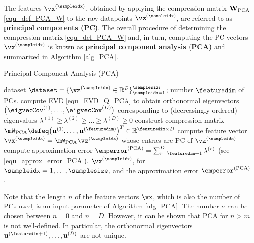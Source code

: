 \documentclass[12pt]{report}
\begin{document}
The features $\vx^{(\sampleidx)}$, obtained by applying the compression matrix $\mathbf{W}_{\rm PCA}$ 
\eqref{equ_def_PCA_W} to the raw datapoints $\vz^{(\sampleidx)}$, are referred to as {\bf principal components (PC)}. 
The overall procedure of determining the compression matrix \eqref{equ_def_PCA_W} and, in turn, computing 
the PC vectors $\vx^{(\sampleidx)}$ is known as {\bf principal component analysis (PCA)} and summarized 
in Algorithm \ref{alg_PCA}. 
\begin{algorithm}[htbp]
\caption{Principal Component Analysis (PCA)}\label{alg_PCA}
\begin{algorithmic}[1]
\renewcommand{\algorithmicrequire}{\textbf{Input:}}
\renewcommand{\algorithmicensure}{\textbf{Output:}}
\Require  dataset  $\dataset=\{ \vz^{(\sampleidx)} \in \mathbb{R}^{D} \}_{\sampleidx=1}^{\samplesize}$; number $\featuredim$ of PCs. 
\State compute EVD \eqref{equ_EVD_Q_PCA} to obtain orthonormal eigenvectors $\big(\eigvecCov^{(1)},\ldots,\eigvecCov^{(D)}\big)$ 
corresponding to (decreasingly ordered) eigenvalues $\lambda^{(1)} \geq \lambda^{(2)}\geq \ldots \geq \lambda^{(D)} \geq 0$
\vspace*{2mm}
\State construct compression matrix $\mW_{\rm PCA}  \defeq \big( \mathbf{u}^{(1)},\ldots, \mathbf{u}^{(\featuredim)} \big)^{T} \in \mathbb{R}^{\featuredim \times D}$ %
\vspace*{2mm}
\State compute feature vector $\vx^{(\sampleidx)} = \mW_{\rm PCA} \vz^{(\sampleidx)}$ whose entries are PC of $\vz^{(\sampleidx)}$ %
\vspace*{2mm}
\State compute approximation error $\emperror^{(\rm PCA)} = \sum_{r = \featuredim+1}^{D} \lambda^{(r)}$ (see \eqref{equ_approx_error_PCA}). 
\vspace*{2mm}
\Ensure $\vx^{(\sampleidx)}$, for $\sampleidx=1,\ldots,\samplesize$, and the approximation error $\emperror^{(\rm PCA)}$. 
\end{algorithmic}
\end{algorithm}
Note that the length $n$ of the feature vectors $\vx$, which is also the number of PCs used, is an 
input parameter of Algorithm \ref{alg_PCA}. The number $n$ can be chosen between $n=0$ and $n=D$. 
However, it can be shown that PCA for $n>m$ is not well-defined. In particular, the orthonormal eigenvectors 
$ \mathbf{u}^{(\featuredim+1)},\ldots, \mathbf{u}^{(D)}$ are not unique. 
\end{document}
